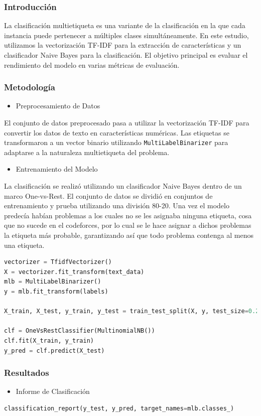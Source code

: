 \documentclass{article}
\begin{document}
\subsubsection{Introducción}
La clasificación multietiqueta es una variante de la clasificación en la que cada instancia puede pertenecer a múltiples clases simultáneamente. En este estudio, utilizamos la vectorización TF-IDF para la extracción de características y un clasificador Naive Bayes para la clasificación. El objetivo principal es evaluar el rendimiento del modelo en varias métricas de evaluación.
\subsubsection{Metodología}
\begin{itemize}
    \item Preprocesamiento de Datos
\end{itemize}
El conjunto de datos preprocesado pasa a utilizar la vectorización TF-IDF para convertir los datos de texto en características numéricas. Las etiquetas se transformaron a un vector binario utilizando \texttt{MultiLabelBinarizer} para adaptarse a la naturaleza multietiqueta del problema.

\begin{itemize}
    \item Entrenamiento del Modelo
\end{itemize}
La clasificación se realizó utilizando un clasificador Naive Bayes dentro de un marco One-vs-Rest. El conjunto de datos se dividió en conjuntos de entrenamiento y prueba utilizando una división 80-20. Una vez el modelo predecía habían problemas a los cuales no se les
asignaba ninguna etiqueta, cosa que no sucede en el codeforces, por lo cual se le hace asignar a dichos problemas la etiqueta más probable, garantizando así que todo problema contenga al menos una etiqueta.

\begin{lstlisting}[language=Python, caption=Naive Bayes]
vectorizer = TfidfVectorizer()
X = vectorizer.fit_transform(text_data)
mlb = MultiLabelBinarizer()
y = mlb.fit_transform(labels)

X_train, X_test, y_train, y_test = train_test_split(X, y, test_size=0.2, random_state=42)

clf = OneVsRestClassifier(MultinomialNB())
clf.fit(X_train, y_train)
y_pred = clf.predict(X_test)
\end{lstlisting}
\newpage
\subsubsection{Resultados}
\begin{itemize}
    \item Informe de Clasificación
\end{itemize}
\begin{lstlisting}[language=Python, caption=Informe de Clasificación]
    classification_report(y_test, y_pred, target_names=mlb.classes_)
\end{lstlisting}
\end{document}
